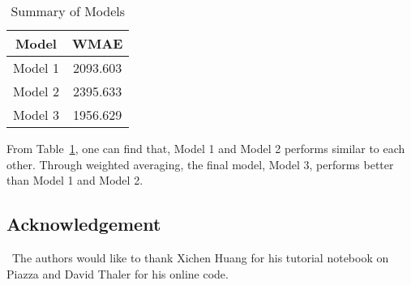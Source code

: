 \documentclass[12pt]{article}
\begin{document}
\begin{table}[htb]
 \caption{Summary of Models} \label{result}
 \vspace{0.1in}
\begin{center}
  \begin{tabular}{  c  c  }
  
    \hline
    Model          &WMAE     \\ \hline
    Model 1         & 2093.603    \\ \hline
    Model 2         & 2395.633    \\ \hline
    Model 3         & 1956.629    \\ \hline
  \end{tabular}
\end{center}
\end{table}

From Table~\ref{result}, one can find that, Model 1 and Model 2 performs similar to each other. Through weighted averaging, the final model, Model 3, performs better than Model 1 and Model 2.

\subsection*{Acknowledgement}


\quad\ The authors would like to thank Xichen Huang for his tutorial notebook on Piazza and David Thaler for his online code.

\vfill\pagebreak

%
\end{document}
